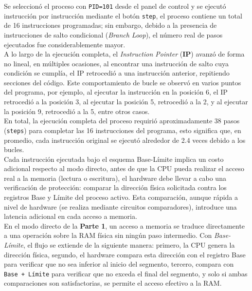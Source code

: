 \documentclass[12pt,letterpaper]{article}
\begin{document}
Se seleccionó el proceso con \texttt{PID=101} desde el panel de control y se ejecutó instrucción por instrucción
mediante el botón \texttt{step}, el proceso contiene un total de 16 instrucciones programadas; sin embargo,
debido a la presencia de instrucciones de salto condicional (\textit{Branch Loop}), el número real de pasos
ejecutados fue considerablemente mayor.\\

A lo largo de la ejecución completa, el \textit{Instruction Pointer} (\textbf{IP}) avanzó de forma no lineal, en
múltiples ocasiones, al encontrar una instrucción de salto cuya condición se cumplía, el IP retrocedió a una
instrucción anterior, repitiendo secciones del código. Este comportamiento de bucle se observó en varios puntos
del programa, por ejemplo, al ejecutar la instrucción en la posición 6, el IP retrocedió a la posición 3, al
ejecutar la posición 5, retrocedió a la 2, y al ejecutar la posición 9, retrocedió a la 5, entre otros casos.\\

En total, la ejecución completa del proceso requirió aproximadamente 38 pasos (\texttt{steps}) para completar las
16 instrucciones del programa, esto significa que, en promedio, cada instrucción original se ejecutó alrededor
de 2.4 veces debido a los bucles.\\
Cada instrucción ejecutada bajo el esquema Base-Límite implica un costo adicional respecto al modo directo, antes
de que la CPU pueda realizar el acceso real a la memoria (lectura o escritura), el hardware debe llevar a cabo
una verificación de protección: comparar la dirección física solicitada contra los registros Base y Límite del
proceso activo. Esta comparación, aunque rápida a nivel de hardware (se realiza mediante circuitos comparadores),
introduce una latencia adicional en cada acceso a memoria.\\

En el modo directo de la \textbf{Parte 1}, un acceso a memoria se traduce directamente a una operación sobre la
RAM física sin ningún paso intermedio. Con \textit{Base-Límite}, el flujo se extiende de la siguiente manera:
primero, la CPU genera la dirección física, segundo, el hardware compara esta dirección con el registro Base para
verificar que no sea inferior al inicio del segmento, tercero, compara con \texttt{Base + Límite} para verificar
que no exceda el final del segmento, y solo si ambas comparaciones son satisfactorias, se permite el acceso
efectivo a la RAM.\\
\end{document}
